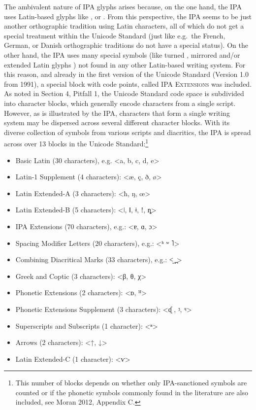 The ambivalent nature of IPA glyphs arises because, on the one hand, the IPA
uses Latin-based glyphs like , or . From this perspective, the IPA seems to be
just another orthographic tradition using Latin characters, all of which do not
get a special treatment within the Unicode Standard (just like e.g.~the French,
German, or Danish orthographic traditions do not have a special status). On the
other hand, the IPA uses many special symbols (like turned , mirrored and/or
extended Latin glyphs ) not found in any other Latin-based writing system. For
this reason, and already in the first version of the Unicode Standard (Version
1.0 from 1991), a special block with code points, called \textsc{IPA Extensions}
was included. As noted in Section 4, Pitfall 1, the Unicode Standard code space
is subdivided into character blocks, which generally encode characters from a
single script. However, as is illustrated by the IPA, characters that form a
single writing system may be dispersed across several different character
blocks. With its diverse collection of symbols from various scripts and
diacritics, the IPA is spread across over 13 blocks in the Unicode
Standard:\footnote{This number of blocks depends on whether only IPA-sanctioned
symbols are counted or if the phonetic symbols commonly found in the literature
are also included, see Moran 2012, Appendix C.}

\begin{itemize}
	\item Basic Latin (30 characters), e.g. <a, b, c, d, e> 
	\item Latin-1 Supplement (4 characters): <æ, ç, ð, ø\textgreater{} 
	\item Latin Extended-A (3 characters): <ħ, ŋ, œ> 
	\item Latin Extended-B (5 characters): <ǀ, ǁ, ǂ, ǃ, ȵ> 
	\item IPA Extensions (70 characters), e.g.: <ɐ, ɑ, ɔ> 
	\item Spacing Modifier Letters (20 characters), e.g.: <ʰ ʷ ˥> 
	\item Combining Diacritical Marks (33 characters), e.g.: <̝ ̥ ̪> 
	\item Greek and Coptic (3 characters): <β, θ, χ> 
	\item Phonetic Extensions (2 characters): <ᴅ, ᴴ> 
	\item Phonetic Extensions Supplement (3 characters): <ᶑ , ᶾ, ᶣ> 
	\item Superscripts and Subscripts (1 character): <ⁿ> 
	\item Arrows (2 characters): \textless{}↑, ↓\textgreater{} 
	\item Latin Extended-C (1 character): <ⱱ> 
\end{itemize}

